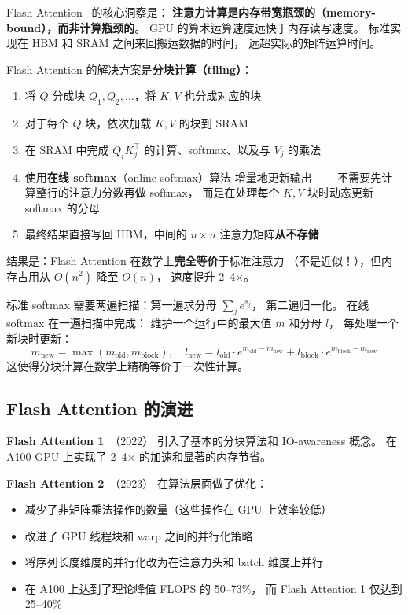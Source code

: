 Flash Attention~\cite{dao2022flashattention,dao2023flashattention2}
的核心洞察是：
\textbf{注意力计算是内存带宽瓶颈的（memory-bound），而非计算瓶颈的}。
GPU 的算术运算速度远快于内存读写速度。
标准实现在 HBM 和 SRAM 之间来回搬运数据的时间，
远超实际的矩阵运算时间。

Flash Attention 的解决方案是\textbf{分块计算（tiling）}：
\begin{enumerate}[noitemsep]
  \item 将 $Q$ 分成块 $Q_1, Q_2, \ldots$，将 $K, V$ 也分成对应的块
  \item 对于每个 $Q$ 块，依次加载 $K, V$ 的块到 SRAM
  \item 在 SRAM 中完成 $Q_i K_j^\top$ 的计算、softmax、以及与 $V_j$ 的乘法
  \item 使用\textbf{在线 softmax}（online softmax）算法
        增量地更新输出——
        不需要先计算整行的注意力分数再做 softmax，
        而是在处理每个 $K, V$ 块时动态更新 softmax 的分母
  \item 最终结果直接写回 HBM，中间的 $n \times n$ 注意力矩阵\textbf{从不存储}
\end{enumerate}

结果是：Flash Attention 在数学上\textbf{完全等价}于标准注意力
（不是近似！），但内存占用从 $O(n^2)$ 降至 $O(n)$，
速度提升 2--4$\times$。

\begin{corebox}
标准 softmax 需要两遍扫描：第一遍求分母 $\sum_j e^{s_j}$，
第二遍归一化。
在线 softmax 在一遍扫描中完成：
维护一个运行中的最大值 $m$ 和分母 $l$，
每处理一个新块时更新：
\[
  m_{\mathrm{new}} = \max(m_{\mathrm{old}}, m_{\mathrm{block}}), \quad
  l_{\mathrm{new}} = l_{\mathrm{old}} \cdot e^{m_{\mathrm{old}} - m_{\mathrm{new}}}
  + l_{\mathrm{block}} \cdot e^{m_{\mathrm{block}} - m_{\mathrm{new}}}
\]
这使得分块计算在数学上精确等价于一次性计算。
\end{corebox}

\subsection{Flash Attention 的演进}

\textbf{Flash Attention 1}~\cite{dao2022flashattention}（2022）
引入了基本的分块算法和 IO-awareness 概念。
在 A100 GPU 上实现了 2--4$\times$ 的加速和显著的内存节省。

\textbf{Flash Attention 2}~\cite{dao2023flashattention2}（2023）
在算法层面做了优化：
\begin{itemize}[noitemsep]
  \item 减少了非矩阵乘法操作的数量（这些操作在 GPU 上效率较低）
  \item 改进了 GPU 线程块和 warp 之间的并行化策略
  \item 将序列长度维度的并行化改为在注意力头和 batch 维度上并行
  \item 在 A100 上达到了理论峰值 FLOPS 的 50--73\%，
        而 Flash Attention 1 仅达到 25--40\%
\end{itemize}

